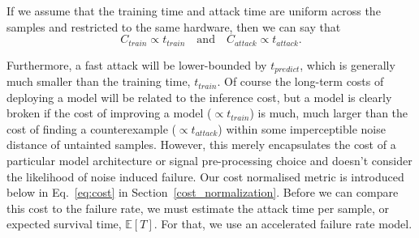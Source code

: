 If we assume that the training time and attack time are uniform across the samples and restricted to the same hardware, then we can say that
\begin{equation}
C_{train} \propto t_{train} \text{~~~and~~~} C_{attack} \propto t_{attack}.
\label{eq:naive_cost}
\end{equation}

Furthermore, a fast attack will be lower-bounded by $t_{predict}$, which is generally much smaller than the training time, $t_{train}$. Of course the long-term costs of deploying a model will be related to the inference cost, but a model is clearly broken if the cost of improving a model ($\propto t_{train}$) is much, much larger than the cost of finding a counterexample ($\propto t_{attack}$) within some imperceptible noise distance of untainted samples. However, this merely encapsulates the cost of a particular model architecture or signal pre-processing choice and doesn't consider the likelihood of noise induced failure. Our cost normalised metric is introduced below in Eq.~\ref{eq:cost} in Section~\ref{cost_normalization}. Before we can compare this cost to the failure rate, we must estimate the attack time per sample, or expected survival time, $\mathbb{E}[T]$. For that, we use an accelerated failure rate model.
